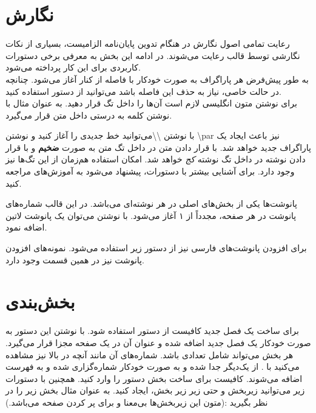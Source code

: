 \section{نگارش}
رعایت تمامی اصول نگارش در هنگام تدوین پایان‌نامه الزامیست، بسیاری از نکات نگارشی توسط قالب رعایت می‌شوند. در ادامه این بخش به معرفی برخی دستورات کاربردی برای این کار پرداخته می‌شود.
\\
به طور پیش‌‌فرض هر پاراگراف به صورت خودکار با فاصله  از کنار آغاز می‌شود.  چنانچه در حالت خاصی، نیاز به حذف این فاصله باشد می‌توانید از دستور 
 \RTL{}\noindent
استفاده کنید.\\
برای نوشتن متون انگلیسی لازم است آن‌ها را داخل تگ
 قرار دهید. به عنوان مثال با نوشتن 
 کلمه  به درستی داخل متن قرار می‌گیرد.
 \par
 با نوشتن \textbackslash\textbackslash می‌توانید خط جدیدی را آغاز کنید و نوشتن \textbackslash par نیز باعث ایجاد یک پاراگراف جدید خواهد شد. با قرار دادن متن در داخل تگ  متن به صورت \textbf{ضخیم} و با قرار دادن نوشته در داخل تگ  نوشته \textit{کج} خواهد شد. امکان استفاده هم‌زمان از این تگ‌ها نیز وجود دارد. برای آشنایی بیشتر با دستورات، پیشنهاد می‌شود به آموزش‌های  مراجعه کنید.
 \par

 پانوشت‌‌ها یکی از بخش‌های اصلی در هر نوشته‌ای می‌باشد. در این قالب شماره‌های پانوشت در هر صفحه، مجدداً از ۱ آغاز می‌شود.  با نوشتن
 \RTL{} \noindent
  می‌توان یک پانوشت لاتین اضافه نمود.
 \par
برای افزودن پانوشت‌های فارسی نیز از دستور زیر استفاده می‌شود.
 \RTL{} \noindent
نمونه‌های افزودن پانوشت نیز در همین قسمت وجود دارد.






\section{بخش‌بندی}
برای ساخت یک فصل جدید کافیست از دستور
 \RTL{} \noindent
استفاده شود. با نوشتن این دستور به صورت خودکار یک فصل جدید اضافه شده و عنوان آن در یک صفحه مجزا قرار می‌گیرد.
هر بخش می‌تواند شامل تعدادی  باشد. شماره‌های آن مانند آنچه در بالا نیز مشاهده می‌کنید با . از یک‌دیگر جدا شده و به صورت خودکار شماره‌گزاری  شده و به فهرست اضافه می‌شوند. کافیست برای ساخت بخش دستور 
 \RTL{}\noindent
را وارد کنید. همچنین با دستورات زیر می‌توانید زیربخش و حتی زیر زیر بخش، ایجاد کنید.
 \RTL{}
 \RTL{}\noindent
به عنوان مثال بخش زیر را در نظر بگیرید :(متون این زیربخش‌ها بی‌معنا و برای پر کردن صفحه می‌باشد.)

